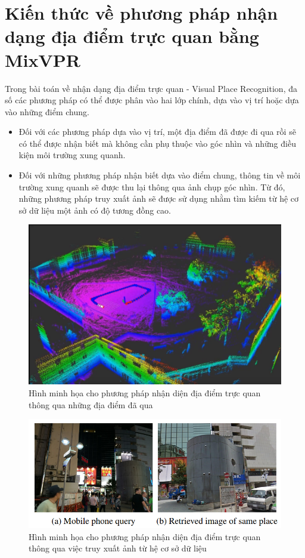 \section{Kiến thức về phương pháp nhận dạng địa điểm trực quan bằng MixVPR}
Trong bài toán về nhận dạng địa điểm trực quan - Visual Place Recognition, đa số các phương pháp có thể được phân vào hai lớp chính, dựa vào vị trí hoặc dựa vào những điểm chung\cite{yin2022general}.
\begin{itemize}
    \item Đối với các phương pháp dựa vào vị trí, một địa điểm đã được đi qua rồi sẽ có thể được nhận biết mà không cần phụ thuộc vào góc nhìn và những điều kiện môi trường xung quanh.
    \item Đối với những phương pháp nhận biết dựa vào điểm chung, thông tin về môi trường xung quanh sẽ được thu lại thông qua ảnh chụp góc nhìn. Từ đó, những phương pháp truy xuất ảnh sẽ được sử dụng nhằm tìm kiếm từ hệ cơ sở dữ liệu một ảnh có độ tương đồng cao.
\end{itemize}
\begin{figure}[H]
    \centering
    \includegraphics[scale=0.4]{pics/Chapter3/position-based.png}
    \caption{Hình minh họa cho phương pháp nhận diện địa điểm trực quan thông qua những địa điểm đã qua \cite{slamposition}}
    \label{fig:enter-label}
\end{figure}
\begin{figure}[H]
    \centering
    \includegraphics[scale=0.7]{pics/Chapter3/overlap-based.png}
    \caption{Hình minh họa cho phương pháp nhận diện địa điểm trực quan thông qua việc truy xuất ảnh từ hệ cơ sở dữ liệu \cite{arandjelovic2016netvlad}}
    \label{fig:enter-label}
\end{figure}

